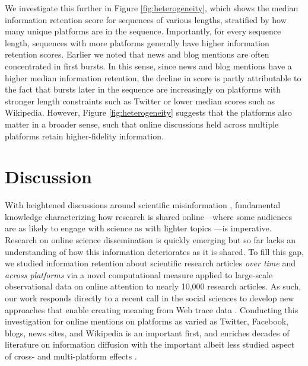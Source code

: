\documentclass[letterpaper]{article} %
\begin{document}
We investigate this further in Figure \ref{fig:heterogeneity}, which shows the median information retention score for sequences of various lengths, stratified by how many unique platforms are in the sequence. Importantly, for every sequence length, sequences with more platforms generally have higher information retention scores. Earlier we noted that news and blog mentions are often concentrated in first bursts. In this sense, since news and blog mentions have a higher median information retention, the decline in score is partly attributable to the fact that bursts later in the sequence are increasingly on platforms with stronger length constraints such as Twitter or lower median scores such as Wikipedia. However, Figure \ref{fig:heterogeneity} suggests that the platforms also matter in a broader sense, such that online discussions held across multiple platforms retain higher-fidelity information.

\section{Discussion}
With heightened discussions around scientific misinformation \cite{scheufele2019science,westMisinformationScience2021}, fundamental knowledge characterizing how research is shared online---where some audiences are as likely to engage with science as with lighter topics \cite{hargittaiHowYoungAdults2018}---is imperative. Research on online science dissemination is quickly emerging \cite{zakhlebinDiffusionScientificArticles2020} %
but so far lacks an understanding of how this information deteriorates as it is shared. To fill this gap, we studied information retention about scientific research articles \textit{over time} and \textit{across platforms} via a novel computational measure applied to large-scale observational data on online attention to nearly 10,000 research articles. As such, our work responds directly to a recent call in the social sciences to develop new approaches that enable creating meaning from Web trace data \citep{lazerMeaningfulMeasuresHuman2021}. Conducting this investigation for online mentions on platforms as varied as Twitter, Facebook, blogs, news sites, and Wikipedia is an important first, and enriches decades of literature on information diffusion \citep{adarTrackingInformationEpidemics2005,lermanInformationContagionEmpirical2010,keeganHotWikiStructures2013,gilbertWidespreadUnderprovisionReddit2013,Goel2015,chengCanCascadesBe2014,chengCascadesRecur2016} with the important albeit less studied aspect of cross- and multi-platform effects \citep[for exceptions, see][]{leskovecMemetrackingDynamicsNews2009,tanLostPropagationUnfolding2016,zakhlebinDiffusionScientificArticles2020}.
\end{document}
